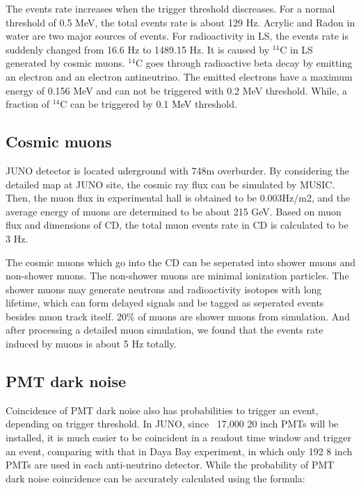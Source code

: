 \documentclass[a4paper,10pt,twoside]{paper}
\begin{document}
	\begin{multicols}{2}

		The events rate increases when the trigger threshold discreases. For a normal threshold of 0.5 MeV, the total events rate is about 129 Hz.
		Acrylic and Radon in water are two major sources of events. For radioactivity in LS, the events rate is suddenly changed from 16.6 Hz to 1489.15 Hz.
		It is caused by $^{14}$C in LS generated by cosmic muons. $^{14}$C goes through radioactive beta decay by emitting an electron and an electron antineutrino.
		The emitted electrons have a maximum energy of 0.156 MeV and can not be triggered with 0.2 MeV threshold. 
		While, a fraction of $^{14}$C can be triggered by 0.1 MeV threshold.

		\subsection{Cosmic muons}
		JUNO detector is located uderground with 748m overburder. By considering the detailed map at JUNO site, the cosmic ray flux can be simulated by MUSIC.
		Then, the muon flux in experimental hall is obtained to be 0.003Hz/m2, and the average energy of muons are determined to be about 215 GeV.
		Based on muon flux and dimensions of CD, the total muon events rate in CD is calculated to be 3 Hz.

		The cosmic muons which go into the CD can be seperated into shower muons and non-shower muons. The non-shower muons are minimal ionization particles.
		The shower muons may generate neutrons and radioactivity isotopes with long lifetime, 
		which can form delayed signals and be tagged as seperated events besides muon track itself. 20\% of muons are shower muons from simulation.
		And after processing a detailed muon simulation, we found that the events rate induced by muons is about 5 Hz totally.


		\subsection{PMT dark noise}
		Coincidence of PMT dark noise also has probabilities to trigger an event, depending on trigger threshold.
		In JUNO, since ~17,000 20 inch PMTs will be installed, it is much easier to be coincident in a readout time window and trigger an event, 
		comparing with that in Daya Bay experiment, in which only 192 8 inch PMTs are used in each anti-neutrino detector.
		While the probability of PMT dark noise coincidence can be accurately calculated using the formula:


\end{multicols}
\end{document}
